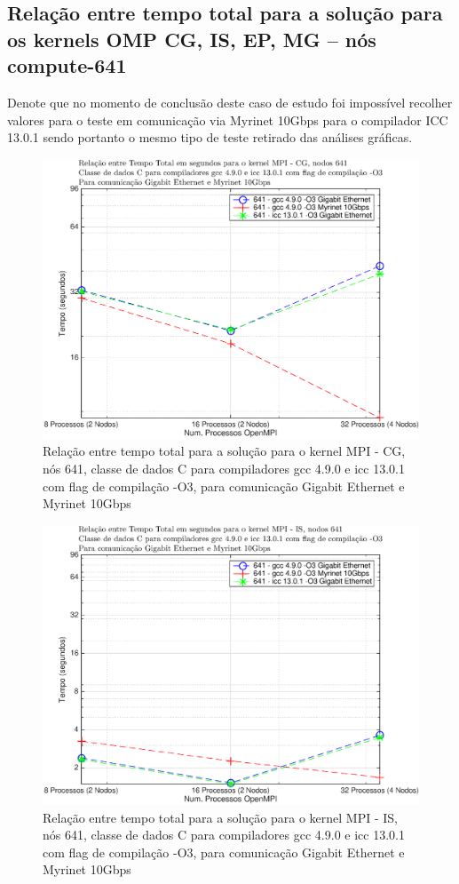 \documentclass[conference,compsoc]{IEEEtran}
\begin{document}
\subsection{Relação entre tempo total para a solução para os kernels OMP CG, IS, EP, MG -- nós compute-641}

Denote que no momento de conclusão deste caso de estudo foi impossível recolher valores para o teste em comunicação via Myrinet 10Gbps para o compilador ICC 13.0.1 sendo portanto o mesmo tipo de teste retirado das análises gráficas. 

\begin{figure}[H]
\centering
\includegraphics[width=1.1\columnwidth]{EPS/MPI/641/mpi_641_cg.eps}
\caption{Relação entre tempo total para a solução para o kernel MPI - CG, nós 641, classe de dados C para compiladores gcc 4.9.0 e icc 13.0.1 com flag de compilação  -O3, para comunicação Gigabit Ethernet e Myrinet 10Gbps}
\label{tempo_mpi_cg_641}
\end{figure}

\begin{figure}[H]
\centering
\includegraphics[width=1.1\columnwidth]{EPS/MPI/641/mpi_641_is.eps}
\caption{Relação entre tempo total para a solução para o kernel MPI - IS, nós 641, classe de dados C para compiladores gcc 4.9.0 e icc 13.0.1 com flag de compilação  -O3, para comunicação Gigabit Ethernet e Myrinet 10Gbps}
\label{tempo_mpi_is_641}
\end{figure}
\end{document}
